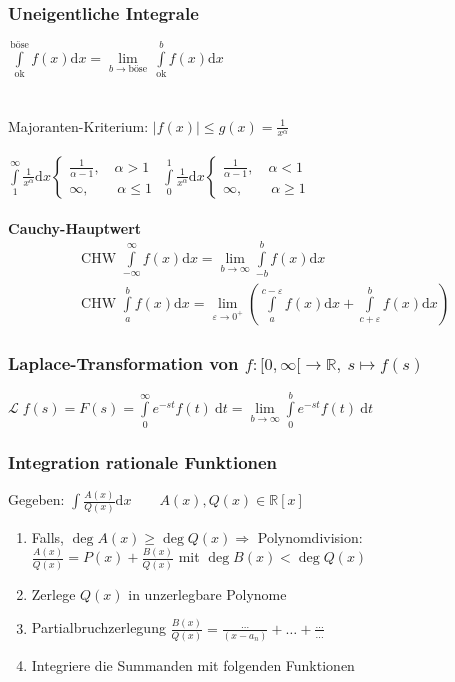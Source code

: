 \documentclass[6pt,a4paper]{scrartcl}
\newcommand{\enbrace}[1]{\ensuremath{\left(#1\right)}}
\newcommand{\Ra}[0]{\ensuremath{\Rightarrow}}
\newcommand{\ra}[0]{\ensuremath{\rightarrow}}
\begin{document}
\begin{multicols*}{4}
\subsubsection{Uneigentliche Integrale}
$\int\limits_{\text{ok}}^{\text{böse}} f(x) \mathrm dx = \lim\limits_{b\rightarrow \text{böse}}\ \int\limits_{\text{ok}}^b f(x) \mathrm dx$\\ \\ \\
Majoranten-Kriterium: $|f(x)|\le g(x) = \frac1{x^\alpha}$\\ \\
$\int\limits_{1}^{\infty} \frac{1}{x^\alpha} \mathrm dx \begin{cases} \frac{1}{\alpha -1}, \quad \alpha > 1 \\ \infty, \qquad \alpha \le 1 \end{cases}$ \qquad
$\int\limits_{0}^{1} \frac{1}{x^\alpha} \mathrm dx \begin{cases} \frac{1}{\alpha -1}, \quad \alpha < 1 \\ \infty, \qquad \alpha \ge 1 \end{cases}$\\ \\
\textbf{Cauchy-Hauptwert}
\begin{eqnarray*}
& \text{CHW }\int\limits_{-\infty}^{\infty} f(x) \mathrm dx = \lim\limits_{b\rightarrow\infty} \int\limits_{-b}^b f(x) \mathrm dx \\
& \text{CHW }\int\limits_{a}^{b} f(x) \mathrm dx=\lim\limits_{\varepsilon \rightarrow 0^+}\enbrace{\int\limits_{a}^{c-\varepsilon} f(x) \mathrm dx+\int\limits_{c+\varepsilon}^{b}f(x)\mathrm dx}
\end{eqnarray*}

\subsubsection{Laplace-Transformation von $f: [0,\infty[ \ra \mathbb R,\ s \mapsto f(s)$}
$\mathcal L \; f(s) = F(s) = \int\limits_{0}^{\infty} e^{-st} f(t)\ \mathrm dt = \lim\limits_{b \ra \infty} \int\limits_{0}^{b} e^{-st} f(t)\ \mathrm dt$

\subsubsection{Integration rationale Funktionen}
Gegeben: $\int \frac{A(x)}{Q(x)} \mathrm dx \qquad A(x),Q(x)\in \mathbb R[x]$
\begin{enumerate}\itemsep0pt
\item Falls, $\deg A(x) \ge \deg Q(x) \Ra$ Polynomdivision: \\ $\frac{A(x)}{Q(x)} = P(x) + \frac{B(x)}{Q(x)}$ mit $\deg B(x) < \deg Q(x)$
\item Zerlege $Q(x)$ in unzerlegbare Polynome
\item Partialbruchzerlegung $\frac{B(x)}{Q(x)} = \frac{\ldots}{(x - a_n)} + \ldots + \frac{\ldots}{\ldots}$
\item Integriere die Summanden mit folgenden Funktionen
\end{enumerate}


\end{multicols*}
\end{document}
